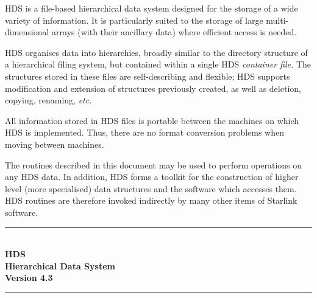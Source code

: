 \documentclass[11pt]{article}
\newcommand{\stardocinitials}  {SUN}
\newcommand{\stardocnumber}    {92.11}
\newcommand{\stardoctitle}     {HDS\\ [1ex]
                                Hierarchical Data System}
\newcommand{\stardocversion}   {Version 4.3}
\newcommand{\stardocname}{\stardocinitials /\stardocnumber}
\newcommand{\htmladdimg}[1]{}
\newenvironment{latexonly}{}{}
\newcommand{\htmlref}[2]{#1}
\newcommand{\htmladdtonavigation}[1]{}
\newcommand{\st}[1]{{\em{#1}}}
\begin{document}
HDS is a file-based hierarchical data system designed for the storage
of a wide variety of information. It is particularly suited to the
storage of large multi-dimensional arrays (with their ancillary data)
where efficient access is needed.

HDS organises data into \htmlref{hierarchies}{fig:hierarchy}, broadly
similar to the directory structure of a hierarchical filing system,
but contained within a single HDS \st{container file.} The structures
stored in these files are self-describing and flexible; HDS supports
modification and extension of structures previously created, as well
as deletion, copying, renaming, \st{etc.}

All information stored in HDS files is portable between the machines
on which HDS is implemented. Thus, there are no format conversion
problems when moving between machines.

The \htmlref{routines}{appendix:alphalist} described in this document
may be used to perform operations on any HDS data. In addition, HDS
forms a toolkit for the construction of higher level (more
specialised) data structures and the software which accesses them.
HDS routines are therefore invoked indirectly by many other items of
Starlink software.
\newcommand{\latexonlytoc}[0]{\tableofcontents}
\begin{htmlonly}
   \renewcommand{\latexonlytoc}[0]{}
   \htmladdtonavigation{\htmlref{\htmladdimg{contents_motif.gif}}
                                            {stardoctoppage}}
\end{htmlonly}
\begin{latexonly}
   \newpage
   \markright{\stardocname}
   \null\vspace{5mm}
   \begin {center}
   \rule{80mm}{0.5mm} \\ [1ex]
   {\Large\bf \stardoctitle \\ [2.5ex]
              \stardocversion} \\ [2ex]
   \rule{80mm}{0.5mm}
   \end{center}
   \setlength{\parskip}{0mm}
   \latexonlytoc
   \setlength{\parskip}{\medskipamount}
\end{latexonly}
\end{document}
